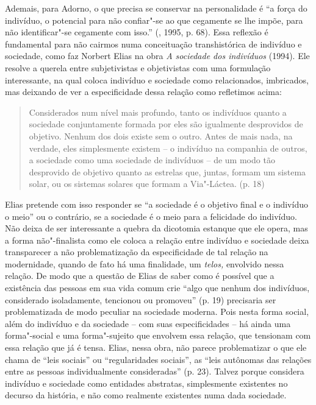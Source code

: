 Ademais, para Adorno, o que precisa se conservar na personalidade é ``a
força do indivíduo, o potencial para não confiar"-se ao que cegamente se
lhe impõe, para não identificar"-se cegamente com isso.'' (, 1995,
p. 68). Essa reflexão é fundamental para não cairmos numa conceituação
transhistórica de indivíduo e sociedade, como faz Norbert Elias na obra
\emph{A sociedade dos indivíduos} (1994). Ele resolve a querela entre
subjetivistas e objetivistas com uma formulação interessante, na qual
coloca indivíduo e sociedade como relacionados, imbricados, mas deixando
de ver a especificidade dessa relação como refletimos acima:

\begin{quote}
Considerados num nível mais profundo, tanto os indivíduos quanto a
sociedade conjuntamente formada por eles são igualmente desprovidos de
objetivo. Nenhum dos dois existe sem o outro. Antes de mais nada, na
verdade, eles simplesmente existem -- o indivíduo na companhia de
outros, a sociedade como uma sociedade de indivíduos -- de um modo tão
desprovido de objetivo quanto as estrelas que, juntas, formam um sistema
solar, ou os sistemas solares que formam a Via"-Láctea. (p. 18)
\end{quote}

Elias pretende com isso responder se ``a sociedade é o objetivo final e
o indivíduo o meio'' ou o contrário, se a sociedade é o meio para a
felicidade do indivíduo. Não deixa de ser interessante a quebra da
dicotomia estanque que ele opera, mas a forma não"-finalista como ele
coloca a relação entre indivíduo e sociedade deixa transparecer a não
problematização da especificidade de tal relação na modernidade, quando
de fato há uma finalidade, um \emph{telos,} envolvido nessa relação. De
modo que a questão de Elias de saber como é possível que a existência
das pessoas em sua vida comum crie ``algo que nenhum dos indivíduos,
considerado isoladamente, tencionou ou promoveu'' (p. 19) precisaria ser
problematizada de modo peculiar na sociedade moderna. Pois nesta forma
social, além do indivíduo e da sociedade -- com suas especificidades --
há ainda uma forma"-social e uma forma"-sujeito que envolvem essa relação,
que tensionam com essa relação que já é tensa. Elias, nessa obra, não
parece problematizar o que ele chama de ``leis sociais'' ou
``regularidades sociais'', as ``leis autônomas das relações entre as
pessoas individualmente consideradas'' (p. 23). Talvez porque considera
indivíduo e sociedade como entidades abstratas, simplesmente existentes
no decurso da história, e não como realmente existentes numa dada
sociedade.


